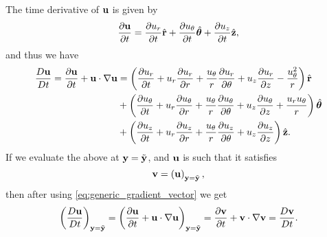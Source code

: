 \documentclass[11pt]{article}
\newcommand{\boldrhat}{\hat{\mathbf{r}}}
\newcommand{\boldthetahat}{\hat{\boldsymbol{\theta}}}
\begin{document}
The time derivative of $\mathbf{u}$ is given by
\begin{equation}
    \frac{\partial \uvec}{\partial t} = \frac{\partial u_r}{\partial t} \boldrhat + \frac{\partial u_\theta}{\partial t} \boldthetahat + \frac{\partial u_z}{\partial t} \hat{\zvec},
\end{equation}
and thus we have
\begin{align}
    \frac{D \uvec}{Dt} = \frac{\partial \uvec}{\partial t} + \uvec \cdot \nabla \uvec &= \left( \frac{\partial u_r}{\partial t} + u_r \frac{\partial u_r}{\partial r} + \frac{u_\theta}{r} \frac{\partial u_r}{\partial \theta} + u_z \frac{\partial u_r}{\partial z} - \frac{u_\theta^2}{r} \right) \boldrhat \\
    &+ \left( \frac{\partial u_\theta}{\partial t} + u_r \frac{\partial u_\theta}{\partial r} + \frac{u_\theta}{r} \frac{\partial u_\theta}{\partial \theta} + u_z \frac{\partial u_\theta}{\partial z} + \frac{u_r u_\theta}{r} \right) \boldthetahat \\
    &+ \left( \frac{\partial u_z}{\partial t} + u_r \frac{\partial u_z}{\partial r} + \frac{u_\theta}{r} \frac{\partial u_z}{\partial \theta} + u_z \frac{\partial u_z}{\partial z} \right) \hat{\zvec}.
\end{align}
If we evaluate the above at $\mathbf{y} = \tilde{\mathbf{y}}$, and $\mathbf{u}$ is such that it satisfies
\begin{equation}
    \mathbf{v} = \left( \mathbf{u} \right)_{\mathbf{y} = \tilde{\mathbf{y}}},
\end{equation}
then after using \cref{eq:generic_gradient_vector} we get
\begin{equation}
    \left( \frac{D\mathbf{u}}{Dt} \right)_{\mathbf{y} = \tilde{\mathbf{y}}} = \left( \frac{\partial \mathbf{u}}{\partial t} + \mathbf{u} \cdot \nabla \mathbf{u} \right)_{\mathbf{y} = \tilde{\mathbf{y}}} = \frac{\partial \mathbf{v}}{\partial t} + \mathbf{v} \cdot \nabla \mathbf{v} = \frac{D \mathbf{v}}{Dt}.
\end{equation}
\end{document}
